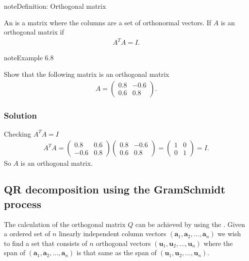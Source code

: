 \documentclass[letterpaper,10pt,english]{jupyterBook}
\begin{document}
\begin{sphinxadmonition}{note}{Definition: Orthogonal matrix}

\sphinxAtStartPar
An  is a matrix where the columns are a set of orthonormal vectors. If \(A\) is an orthogonal matrix if
\begin{align*}
    A^T A=I.
\end{align*}\end{sphinxadmonition}

\begin{sphinxadmonition}{note}{Example 6.8}

\sphinxAtStartPar
Show that the following matrix is an orthogonal matrix
\begin{align*}
    A= \begin{pmatrix}
        0.8 & -0.6\\
        0.6 & 0.8
    \end{pmatrix}.
\end{align*}\subsubsection*{Solution}

\sphinxAtStartPar
Checking \(A^T A=I\)
\begin{align*}
    A^T A=\begin{pmatrix}
        0.8 & 0.6\\
        -0.6 & 0.8
    \end{pmatrix}
    \begin{pmatrix}
        0.8 & -0.6\\
        0.6 & 0.8
    \end{pmatrix} = 
    \begin{pmatrix}
        1 & 0\\
        0 & 1
    \end{pmatrix}=I.
\end{align*}
\sphinxAtStartPar
So \(A\) is an orthogonal matrix.
\end{sphinxadmonition}


\subsection{QR decomposition using the Gram\sphinxhyphen{}Schmidt process}
\label{\detokenize{6_Direct_methods/6.4_QR_decomposition:qr-decomposition-using-the-gram-schmidt-process}}\label{\detokenize{6_Direct_methods/6.4_QR_decomposition:qr-gram-schmidt-section}}
\sphinxAtStartPar
The calculation of the orthogonal matrix \(Q\) can be achieved by using the . Given a ordered set of \(n\) linearly independent column vectors \((\mathbf{a}_1 ,\mathbf{a}_2 ,\dots ,\mathbf{a}_n)\) we wish to find a set that consists of \(n\) orthogonal vectors \((\mathbf{u}_1 ,\mathbf{u}_2 ,\dots ,\mathbf{u}_n)\) where the span of \((\mathbf{a}_1 ,\mathbf{a}_2 ,\dots ,\mathbf{a}_n)\) is that same as the span of \((\mathbf{u}_1 ,\mathbf{u}_2 ,\dots ,\mathbf{u}_n)\).
\end{document}
